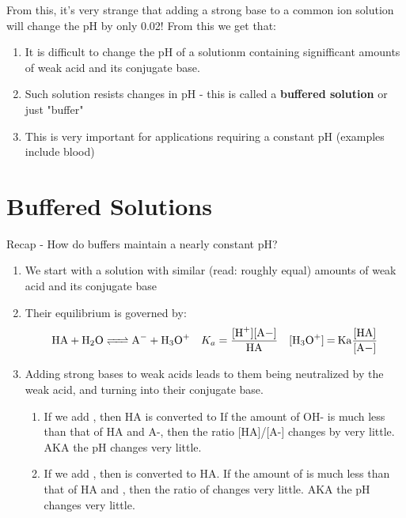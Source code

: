 \documentclass{article}  %
\begin{document}
From this, it's very strange that adding a strong base to a common ion solution will change the pH by only 0.02! From this we get that:
\begin{enumerate}
    \item It is difficult to change the pH of a solutionm containing signifficant amounts of weak acid and its conjugate base.
    \item Such solution resists changes in pH - this is called a \textbf{buffered solution} or just "buffer"
    \item This is very important for applications requiring a constant pH (examples include blood)
\end{enumerate}

\section*{Buffered Solutions}
Recap - How do buffers maintain a nearly constant pH?
\begin{enumerate}
    \item We start with a solution with similar (read: roughly equal) amounts of weak acid and its conjugate base
    \item Their equilibrium is governed by:
    \begin{equation*}
        \begin{aligned}
            \ce{HA + H2O <=> A- + H3O+} \quad K_a = \ce{\frac{[H+][A-]}{HA}} \quad \ce{[H3O+] = Ka\frac{[HA]}{[A-]}}
        \end{aligned}
    \end{equation*}
    \item Adding strong bases to weak acids leads to them being neutralized by the weak acid, and turning into their conjugate base. 
    \begin{enumerate}
        \item If we add , then HA is converted to  If the amount of OH- is much less than that of HA and A-, then the ratio [HA]/[A-] changes by very little. AKA the pH changes very little.
        \item If we add , then  is converted to HA. If the amount of  is much less than that of HA and , then the ratio of \ce{[HA]/[A-]} changes very little. AKA the pH changes very little.
    \end{enumerate}
\end{enumerate}
\end{document}

